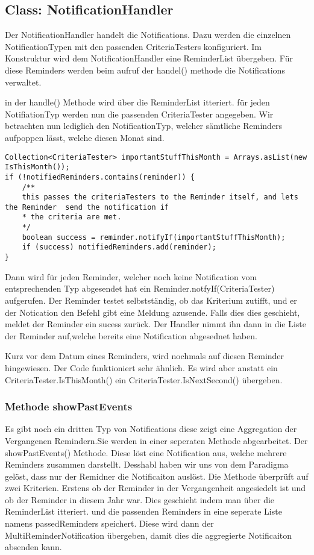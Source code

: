\subsection{Class: NotificationHandler}
Der NotificationHandler handelt die Notifications. Dazu werden die einzelnen NotificationTypen mit den passenden CriteriaTesters konfiguriert.
Im Konstruktur wird dem NotificationHandler eine ReminderList übergeben. Für diese Reminders werden beim aufruf der handel() methode die Notifications verwaltet.


in der handle() Methode wird über die ReminderList itteriert. für jeden NotifiationTyp  werden nun die passenden CriteriaTester angegeben.
Wir betrachten nun  lediglich den NotificationTyp, welcher sämtliche Reminders aufpoppen lässt, welche  diesen Monat sind. 

\begin{lstlisting}[caption = NotificationHandler.handle]
Collection<CriteriaTester> importantStuffThisMonth = Arrays.asList(new IsThisMonth());
if (!notifiedReminders.contains(reminder)) {
    /**
    this passes the criteriaTesters to the Reminder itself, and lets the Reminder  send the notification if
    * the criteria are met.
    */
    boolean success = reminder.notifyIf(importantStuffThisMonth);
    if (success) notifiedReminders.add(reminder);
}
\end{lstlisting}
Dann wird für jeden Reminder, welcher noch keine Notification vom entsprechenden Typ abgesendet hat ein Reminder.notfyIf(CriteriaTester) aufgerufen.
Der Reminder testet selbstständig, ob das Kriterium zutifft, und er der Notication den Befehl gibt eine Meldung azusende. Falls dies dies geschieht, meldet der Reminder ein sucess zurück. Der Handler nimmt ihn dann in die Liste der Reminder auf,welche bereits eine Notification abgesednet haben.

Kurz vor dem Datum eines Reminders, wird nochmals auf diesen Reminder hingewiesen.
Der Code funktioniert sehr ähnlich. Es wird aber anstatt ein CriteriaTester.IsThisMonth() ein CriteriaTester.IsNextSecond() übergeben.

\subsubsection{Methode showPastEvents}

Es gibt noch ein dritten Typ von Notifications diese zeigt eine Aggregation der Vergangenen Remindern.Sie werden in einer seperaten Methode abgearbeitet. Der showPastEvents() Methode. Diese löst eine Notification aus, welche mehrere Reminders zusammen darstellt. Desshabl haben wir uns von dem Paradigma gelöst, dass nur der Remidner die Notificaiton auslöst.
Die Methode überprüft auf zwei Kriterien. Erstens ob der Reminder in der Vergangenheit angesiedelt ist  und ob  der Reminder in diesem Jahr war.
Dies geschieht indem man über die ReminderList itteriert. und die passenden Reminders in eine seperate Liste namens passedReminders speichert.
Diese wird dann der MultiReminderNotification übergeben, damit dies die aggregierte Notificaiton absenden kann.

